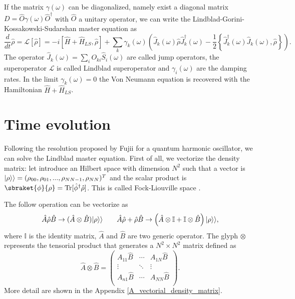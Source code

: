 If the matrix $\gamma(\omega)$ can be diagonalized, namely exist a diagonal matrix $D=\hat O \gamma(\omega) \hat O^\dagger$ with $\hat O$ a unitary operator, we can write the Lindblad-Gorini-Kossakowski-Sudarshan master equation as
\begin{equation}\label{Lindbladian}
    \frac{d}{dt}\hat\rho =\mathcal{L}\left[\hat\rho\right] = -i\left[\hat H+\hat H_{LS},\hat\rho\right] + \sum_k \gamma_k(\omega) \left(\hat J_k(\omega) \hat\rho \hat J^\dagger_k(\omega) - \frac{1}{2}\left\{ \hat J^\dagger_k(\omega)\hat J_k(\omega), \hat\rho\right\} \right).
\end{equation}
The operator $\hat J_k(\omega)= \sum_i O_{ki} \hat S_{i}(\omega)$ are called jump operators, the superoperator $\mathcal{L}$ is called Lindblad superoperator and $\gamma_i(\omega)$ are the damping rates. In the limit $\gamma_k(\omega) = 0$ the Von Neumann equation is recovered with the Hamiltonian $\hat H+\hat H_{LS}$.

\section{Time evolution}
Following the resolution proposed by Fujii \cite{fujii2012} for a quantum harmonic oscillator, we can solve the Lindblad master equation. 
First of all, we vectorize the density matrix: let introduce an Hilbert space with dimension $N^2$ such that a vector is $\lvert\rho\rangle\rangle = (\rho_{00},\rho_{01},...,\rho_{NN-1},\rho_{NN})^T$ and the scalar product is $\sbraket{\phi}{\rho}= \Tr[\hat\phi^\dagger\hat\rho]$. This is called Fock-Liouville space \cite{Manzano}.

The follow operation can be vectorize as
\begin{equation}
    \hat A \hat\rho \hat B \rightarrow (\hat A\otimes\hat B)\lvert\rho\rangle\rangle \qquad \hat A \hat\rho +\hat\rho\hat B \rightarrow \left(\hat A\otimes\mathbb{I} +\mathbb{I}\otimes\hat B\right)\lvert\rho\rangle\rangle,
\end{equation}
where $\mathbb{I}$ is the identity matrix, $\hat A$ and $\hat B$ are two generic operator. The glyph $\otimes$ represents the tensorial product that generates a $N^2\times N^2$ matrix defined as
\begin{equation}
    \hat A\otimes\hat B = \begin{pmatrix}
        A_{11} \hat B & \cdots & A_{1N}\hat B\\
        \vdots & \ddots &\vdots\\
        A_{n1}\hat B& \cdots & A_{NN}\hat B\\
    \end{pmatrix}.
\end{equation}
More detail are shown in the Appendix \ref{A_vectorial_density_matrix}.

